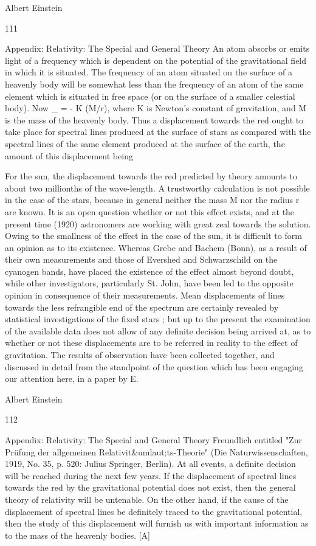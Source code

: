 \documentclass{article}
\begin{document}
Albert Einstein

111

Appendix: Relativity: The Special and General Theory
An atom absorbs or emits light of a frequency which is dependent
on the potential of the gravitational field in which it is situated.
The frequency of an atom situated on the surface of a heavenly body will be somewhat
less than the frequency of an atom of the same element which is situated in free space (or on
the surface of a smaller celestial body).
Now \_ = - K (M/r), where K is Newton's constant of gravitation, and M is the mass of the
heavenly body. Thus a displacement towards the red ought to take place for spectral lines
produced at the surface of stars as compared with the spectral lines of the same element
produced at the surface of the earth, the amount of this displacement being

For the sun, the displacement towards the red predicted by theory amounts to about two
millionths of the wave-length. A trustworthy calculation is not possible in the case of the
stars, because in general neither the mass M nor the radius r are known.
It is an open question whether or not this effect exists, and at the present time (1920)
astronomers are working with great zeal towards the solution. Owing to the smallness of the
effect in the case of the sun, it is difficult to form an opinion as to its existence. Whereas
Grebe and Bachem (Bonn), as a result of their own measurements and those of Evershed
and Schwarzschild on the cyanogen bands, have placed the existence of the effect almost
beyond doubt, while other investigators, particularly St. John, have been led to the opposite
opinion in consequence of their measurements.
Mean displacements of lines towards the less refrangible end of the spectrum are
certainly revealed by statistical investigations of the fixed stars ; but up to the present the
examination of the available data does not allow of any definite decision being arrived at, as
to whether or not these displacements are to be referred in reality to the effect of gravitation.
The results of observation have been collected together, and discussed in detail from the
standpoint of the question which has been engaging our attention here, in a paper by E.

Albert Einstein

112

Appendix: Relativity: The Special and General Theory
Freundlich entitled "Zur Prüfung der allgemeinen Relativit\&umlaut;ts-Theorie" (Die
Naturwissenschaften, 1919, No. 35, p. 520: Julius Springer, Berlin).
At all events, a definite decision will be reached during the next few years. If the
displacement of spectral lines towards the red by the gravitational potential does not exist,
then the general theory of relativity will be untenable. On the other hand, if the cause of the
displacement of spectral lines be definitely traced to the gravitational potential, then the
study of this displacement will furnish us with important information as to the mass of the
heavenly bodies. [A]
\end{document}
